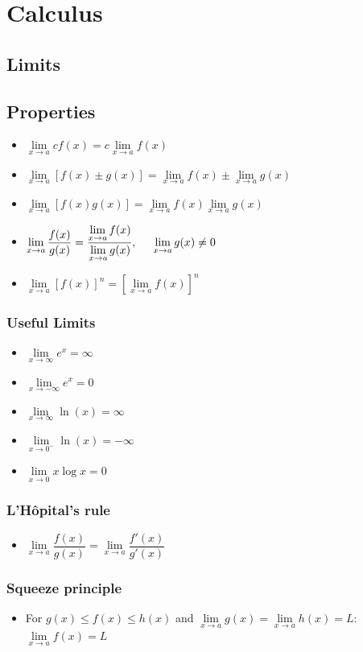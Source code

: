 \documentclass[]{report}
\newcommand \tab[1][1cm]{\hspace*{#1}}
\newcommand{\itemt}{\item \tab}
\begin{document}
	\section{Calculus}



		\subsection{Limits}

		\subsection{Properties}
\begin{itemize}
\itemt \( \lim\limits_{x\to a} cf(x) = c\lim\limits_{x\to a} f(x) \)
\itemt \( \lim\limits_{x\to a} [f(x) \pm g(x)] = \lim\limits_{x\to a} f(x) \pm \lim\limits_{x\to a} g(x) \)
\itemt \( \lim\limits_{x\to a} [f(x) g(x)] = \lim\limits_{x\to a} f(x)  \lim\limits_{x\to a} g(x) \)
\itemt \( \lim\limits_{x\to a} \dfrac{f(x)}{g(x)} = \dfrac{\lim\limits_{x\to a} f(x)}{\lim\limits_{x\to a} g(x)}, \tab[0.5cm] \lim\limits_{x\to a} g(x) \neq 0 \)
\itemt \( \lim\limits_{x\to a} [f(x)]^n = [\lim\limits_{x\to a} f(x)]^n \)
\end{itemize}

\subsubsection{Useful Limits}
\begin{itemize}
\itemt \( \lim\limits_{x\to \infty} e^x = \infty \)
\itemt \( \lim\limits_{x\to -\infty} e^x = 0 \)
\itemt \( \lim\limits_{x\to \infty} \ln(x) = \infty \)
\itemt \( \lim\limits_{x\to 0^-} \ln(x) = -\infty \)
\itemt \( \lim\limits_{x\to 0} x\log x = 0 \)
\end{itemize}

\subsubsection{L'H\^opital's rule}
\begin{itemize}
\itemt \( \lim\limits_{x\to a} \dfrac{f(x)}{g(x)} = \lim\limits_{x\to a} \dfrac{f'(x)}{g'(x)}  \)
\end{itemize}

\subsubsection{Squeeze principle}
\begin{itemize}
\itemt For \( g(x) \leq f(x) \leq h(x) \) and \( \lim\limits_{x\to a} g(x) = \lim\limits_{x\to a} h(x) = L\):
\subitem\tab \( \lim\limits_{x\to a} f(x) = L \)
\end{itemize}
\end{document}
